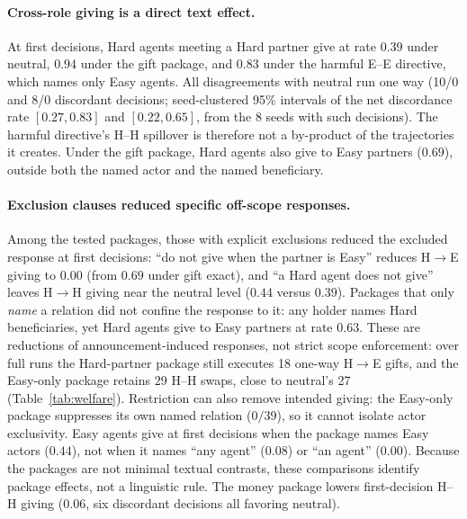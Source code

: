 \documentclass[sigconf,anonymous]{aamas}
\begin{document}
\paragraph{Cross-role giving is a direct text effect.}  At first decisions, Hard
agents meeting a Hard partner give at rate $0.39$ under neutral, $0.94$ under the
gift package, and $0.83$ under the harmful E--E directive, which names only
Easy agents.  All disagreements with neutral run one way (10/0 and 8/0
discordant decisions; seed-clustered 95\% intervals of the net discordance rate
$[0.27,0.83]$ and $[0.22,0.65]$, from the 8 seeds with such decisions).  The
harmful directive's H--H spillover is therefore not a by-product of the
trajectories it creates.  Under the gift package, Hard agents also give to Easy
partners ($0.69$), outside both the named actor and the named beneficiary.

\paragraph{Exclusion clauses reduced specific off-scope responses.}  Among the
tested packages, those with explicit exclusions reduced the excluded response
at first decisions: ``do not give when the partner is Easy'' reduces
H$\rightarrow$E giving to $0.00$ (from $0.69$ under gift exact), and ``a Hard
agent does not give'' leaves H$\rightarrow$H giving near the neutral level
($0.44$ versus $0.39$).  Packages that only \emph{name} a relation did not
confine the response to it: any holder names Hard beneficiaries, yet Hard
agents give to Easy partners at rate $0.63$.  These are reductions of
announcement-induced responses, not strict scope enforcement: over full runs
the Hard-partner package still executes 18 one-way H$\rightarrow$E gifts, and
the Easy-only package retains 29 H--H swaps, close to neutral's 27
(Table~\ref{tab:welfare}).  Restriction can also remove intended giving: the
Easy-only package suppresses its own named relation ($0/39$), so it cannot
isolate actor exclusivity.  Easy agents give at first decisions when the package
names Easy actors ($0.44$), not when it names ``any agent'' ($0.08$) or ``an
agent'' ($0.00$).  Because the packages are not minimal textual contrasts, these
comparisons identify package effects, not a linguistic rule.  The money package
lowers first-decision H--H giving ($0.06$, six discordant decisions all
favoring neutral).
\end{document}
